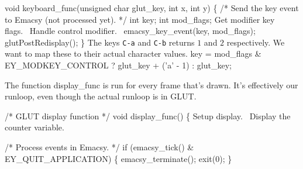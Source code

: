 \nwenddocs{}\endmoddef\nwstartdeflinemarkup{}\nwenddeflinemarkup
void keyboard_func(unsigned char glut_key, 
                   int x, int y) \{
  /* Send the key event to Emacsy 
     (not processed yet). */
  int key;
  int mod_flags;
  \LA{}Get modifier key flags.~{\nwtagstyle{}}\RA{}
  \LA{}Handle control modifier.~{\nwtagstyle{}}\RA{}
  emacsy_key_event(key, 
                   mod_flags);
  glutPostRedisplay();
\}
\nwendcode{}The keys \verb|C-a| and \verb|C-b| returns $1$ and $2$
respectively. We want to map these to their actual character values.
\nwenddocs{}\endmoddef\nwstartdeflinemarkup{}\nwenddeflinemarkup
key = mod_flags & EY_MODKEY_CONTROL 
  ? glut_key + ('a' - 1) 
  : glut_key;
\nwendcode{}\nwdocspar

The function {\Tt{}display{\_}func\nwendquote} is run for every frame that's
drawn. It's effectively our runloop, even though the actual runloop is
in GLUT.

\nwenddocs{}\plusendmoddef\nwstartdeflinemarkup{}\nwenddeflinemarkup
/* GLUT display function */
void display_func() \{
  \LA{}Setup display.~{\nwtagstyle{}}\RA{}
  \LA{}Display the counter variable.~{\nwtagstyle{}}\RA{}

  /* Process events in Emacsy. */
  if (emacsy_tick() & EY_QUIT_APPLICATION) \{
    emacsy_terminate();
    exit(0);
  \}

